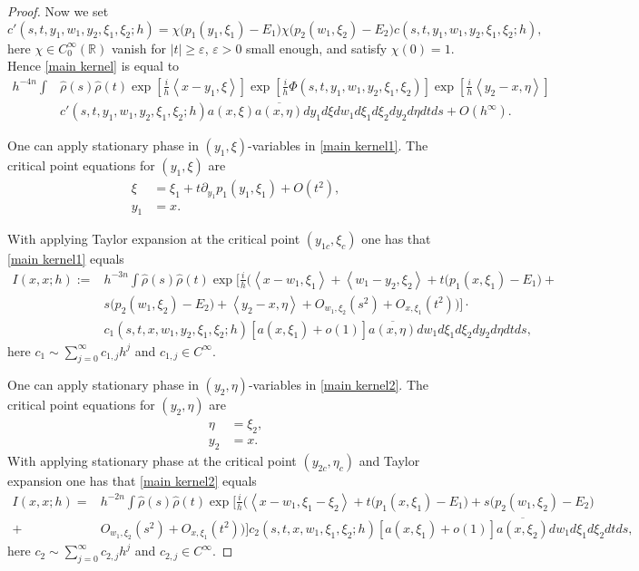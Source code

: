 \documentclass[12pt,reqno]{amsart}
\renewcommand{\epsilon}{\varepsilon}
\numberwithin{equation}{section}
\begin{document}
\begin{proof}
Now we set
\begin{equation*}
c'(s,t,y_1,w_1,y_2,\xi_1,\xi_2;h)=\chi\big(p_1(y_1,\xi_1)-E_1\big) \chi\big(p_2(w_1,\xi_2)-E_2\big)c(s,t,y_1,w_1,y_2,\xi_1,\xi_2;h),
\end{equation*}
here $\chi\in C_0^\infty(\mathbb{R})$ vanish for $|t|\geq \epsilon$, $\epsilon>0$ small enough, and satisfy $\chi(0)=1$.
Hence \eqref{main kernel} is equal to
\begin{align}\label{main kernel1}
h^{- 4n}\int &\hat{\rho}(s) \hat{\rho}(t) \exp[\frac{i}h \left<x-y_1, \xi\right>] \exp[\frac{i}h \Phi(s,t,y_1,w_1,y_2,\xi_1,\xi_2)]\exp[\frac{i}h \left<y_2-x, \eta\right>]  \nonumber \\
 &c'(s,t,y_1,w_1,y_2,\xi_1,\xi_2;h) a(x, \xi) \overline{a(x, \eta)} dy_1 d\xi dw_1 d\xi_1 d\xi_2 dy_2 d\eta dt ds + O(h^\infty).
\end{align}

One can apply stationary phase in $(y_1, \xi)$-variables in \eqref{main kernel1}. The critical point equations for $(y_1, \xi)$ are
\begin{align}
\xi&=\xi_1+ t\partial_{y_1} p_1(y_1,\xi_1)+ O(t^2), \\
y_1&=x.
\end{align}

With applying Taylor expansion at the critical point $(y_{1c}, \xi_{c})$ one has that \eqref{main kernel1} equals
\begin{align}
I (x,x; h):=&h^{-3n}\int \hat{\rho}(s) \hat{\rho}(t)  \exp\Big[\frac{i}h\Big(\left<x-w_1, \xi_1\right>+\left<w_1-y_2,\xi_2\right>+ t(p_1(x,\xi_1)-E_1\big)+\nonumber \\
&s\big(p_2(w_1,\xi_2)-E_2\big) +\left<y_2-x, \eta\right>+O_{w_1,\xi_2}(s^2)+O_{x,\xi_1}(t^2) \Big)\Big]\cdot  \nonumber\\
& c_1(s,t,x, w_1,y_2,\xi_1,\xi_2;h)[a(x, \xi_1)+o(1)] \overline{a(x, \eta)} dw_1 d\xi_1 d\xi_2 dy_2 d\eta dt ds,   \label{main kernel2}
\end{align}
here $c_1\sim \sum_{j=0}^\infty c_{1,j} h^j$ and $c_{1,j}\in C^\infty$.

One can apply stationary phase in $(y_2, \eta)$-variables in \eqref{main kernel2}. The critical point equations for $(y_2, \eta)$ are
\begin{align}
\eta&=\xi_2, \\
y_2&=x.
\end{align}
With applying stationary phase at the critical point $(y_{2c}, \eta_{c})$ and Taylor expansion one has that \eqref{main kernel2} equals
\begin{align*}
I (x,x; h)=&h^{-2n}\int \hat{\rho}(s) \hat{\rho}(t)  \exp\Big[\frac{i}h\Big(\left<x-w_1, \xi_1-\xi_2\right>+ t(p_1(x,\xi_1)-E_1\big)+s\big(p_2(w_1,\xi_2)-E_2\big)  \nonumber \\
+&O_{w_1,\xi_2}(s^2)+O_{x,\xi_1}(t^2) \Big)\Big]  c_2(s,t,x, w_1,\xi_1,\xi_2;h) [a(x, \xi_1)+o(1)] \overline{a(x, \xi_2)}  dw_1 d\xi_1 d\xi_2 dt ds,
\end{align*}
here $c_2\sim \sum_{j=0}^\infty c_{2,j} h^j$ and $c_{2,j}\in C^\infty$.


\end{proof}
\end{document}
